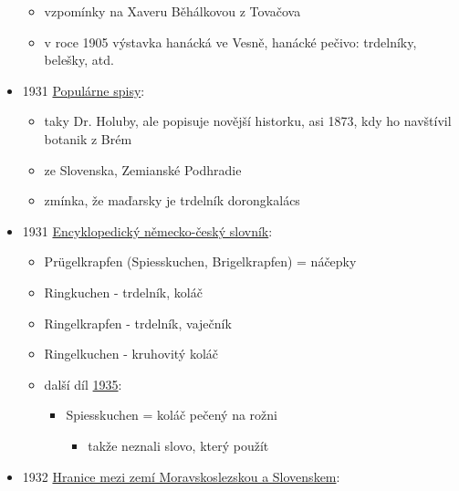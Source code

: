 \begin{itemize}
  \begin{itemize}
  \tightlist
  \item
    vzpomínky na Xaveru Běhálkovou z Tovačova
  \item
    v roce 1905 výstavka hanácká ve Vesně, hanácké pečivo: trdelníky,
    belešky, atd.
  \end{itemize}
\item
  1931
  \href{https://ndk.cz/view/uuid:dc35f5d0-c266-11ed-ac82-5ef3fc9bb22f?page=uuid\%3Acb35b596-b227-47df-bc08-358154471f54}{Populárne
  spisy}:

  \begin{itemize}
  \tightlist
  \item
    taky Dr. Holuby, ale popisuje novější historku, asi 1873, kdy ho
    navštívil botanik z Brém
  \item
    ze Slovenska, Zemianské Podhradie
  \item
    zmínka, že maďarsky je trdelník dorongkalács
  \end{itemize}
\item
  1931
  \href{https://ceskadigitalniknihovna.cz/uuid/uuid:918bbf20-d4ea-11e7-a047-005056825209}{Encyklopedický
  německo-český slovník}:

  \begin{itemize}
  \tightlist
  \item
    Prügelkrapfen (Spiesskuchen, Brigelkrapfen) = náčepky
  \item
    Ringkuchen - trdelník, koláč
  \item
    Ringelkrapfen - trdelník, vaječník
  \item
    Ringelkuchen - kruhovitý koláč
  \item
    další díl
    \href{https://ceskadigitalniknihovna.cz/uuid/uuid:83ae629b-8a1b-4b33-a2cb-0141786babd8}{1935}:

    \begin{itemize}
    \tightlist
    \item
      Spiesskuchen = koláč pečený na rožni

      \begin{itemize}
      \tightlist
      \item
        takže neznali slovo, který použít
      \end{itemize}
    \end{itemize}
  \end{itemize}
\item
  1932
  \href{https://ceskadigitalniknihovna.cz/view/uuid:60ab056c-5ee1-43ab-9014-e91189880750?page=uuid\%3A31d79ba8-8100-11ed-8b6a-001b63bd97ba&fulltext=trd*&source=kfbz}{Hranice
  mezi zemí Moravskoslezskou a Slovenskem}:


\end{itemize}
